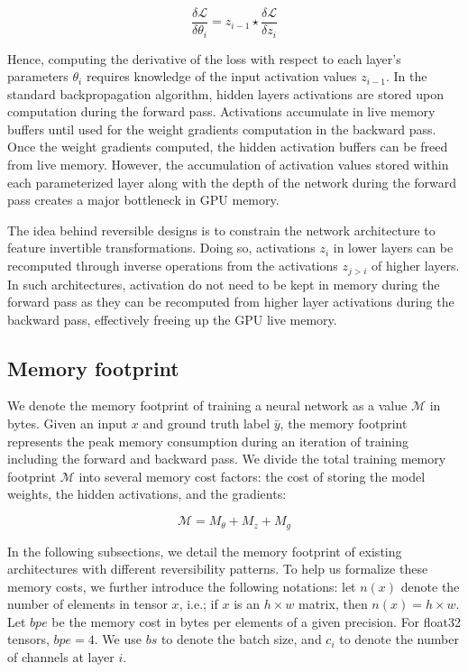 \documentclass[twocolumn]{bmcart}
\begin{document}
 \begin{equation}
\frac{\delta \mathcal{L}}{\delta \theta_i} = z_{i-1} \star \frac{\delta \mathcal{L}}{\delta z_i} 
 \end{equation}

Hence, computing the derivative of the loss with respect to each layer's parameters $\theta_i$ requires knowledge of the input activation values $z_{i-1}$.  
In the standard backpropagation algorithm, hidden layers activations are stored upon computation during the forward pass. 
Activations accumulate in live memory buffers until used for the weight gradients computation in the backward pass. 
Once the weight gradients computed, the hidden activation buffers can be freed from live memory. 
However, the accumulation of activation values stored within each parameterized layer along with the depth of the network during the forward pass creates a major bottleneck in GPU memory.

The idea behind reversible designs is to constrain the network architecture to feature invertible transformations.
Doing so, activations $z_i$ in lower layers can be recomputed through inverse operations from the activations $z_{j>i}$ of higher layers.
In such architectures, activation do not need to be kept in memory during the forward pass as they can be recomputed from higher layer activations during the backward pass, effectively freeing up the GPU live memory.

\subsection{Memory footprint}

We denote the memory footprint of training a neural network as a value $\mathcal{M}$ in bytes. Given an input $x$ and ground truth label $\bar{y}$, the memory footprint represents the peak memory consumption during an iteration of training including the forward and backward pass.
We divide the total training memory footprint $\mathcal{M}$ into several memory cost factors: the cost of storing the model weights, the hidden activations, and the gradients:

\begin{equation}
\mathcal{M} = M_{\theta} + M_{z} + M_{g}
\end{equation}

In the following subsections, we detail the memory footprint of existing architectures with different reversibility patterns.
To help us formalize these memory costs, we further introduce the following notations: let $n(x)$ denote the number of elements in tensor $x$, i.e.; if $x$ is an $h \times w$ matrix, then $n(x)=h \times w$. 
Let $bpe$ be the memory cost in bytes per elements of a given precision. 
For float32 tensors, $bpe=4$. We use $bs$ to denote the batch size, and $c_i$ to denote the number of channels at layer $i$.
\end{document}
